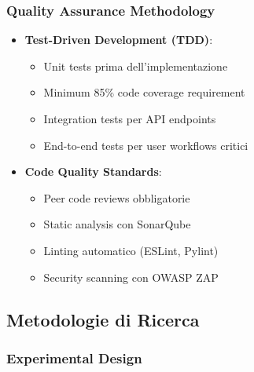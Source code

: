 \documentclass[12pt,a4paper]{report}
\begin{document}
\subsubsection{Quality Assurance Methodology}

\begin{itemize}
    \item \textbf{Test-Driven Development (TDD)}:
    \begin{itemize}
        \item Unit tests prima dell'implementazione
        \item Minimum 85\% code coverage requirement
        \item Integration tests per API endpoints
        \item End-to-end tests per user workflows critici
    \end{itemize}
    
    \item \textbf{Code Quality Standards}:
    \begin{itemize}
        \item Peer code reviews obbligatorie
        \item Static analysis con SonarQube
        \item Linting automatico (ESLint, Pylint)
        \item Security scanning con OWASP ZAP
    \end{itemize}
\end{itemize}

\subsection{Metodologie di Ricerca}

\subsubsection{Experimental Design}
\end{document}
